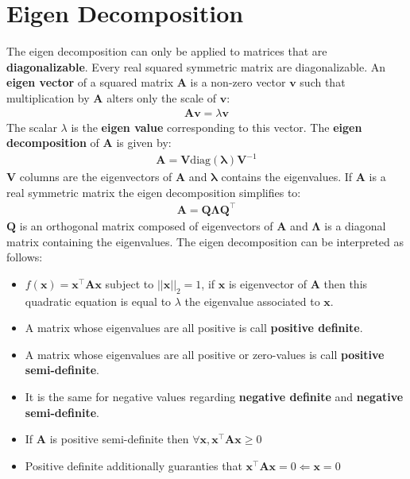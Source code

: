 \documentclass[12pt]{report}
\begin{document}
    \section{Eigen Decomposition}
        The eigen decomposition can only be applied to matrices that are \textbf{diagonalizable}. Every real squared symmetric matrix are diagonalizable.
        An \textbf{eigen vector} of a squared matrix $\boldsymbol{A}$ is a non-zero vector $\boldsymbol{v}$ such that multiplication by  $\boldsymbol{A}$ alters only the scale of $\boldsymbol{v}$:
        \begin{align}
            \boldsymbol{A}\boldsymbol{v} = \lambda \boldsymbol{v}
        \end{align}
        The scalar $\lambda$ is the \textbf{eigen value} corresponding to this    vector.
        The \textbf{eigen decomposition} of $\boldsymbol{A}$ is given by:
        \begin{align}
            \boldsymbol{A} =   \boldsymbol{V}\text{diag}(\boldsymbol{\lambda})\boldsymbol{V}^{-1}
        \end{align}
        $\boldsymbol{V}$ columns are the eigenvectors of $\boldsymbol{A}$ and $\boldsymbol{\lambda}$ contains the eigenvalues. If $\boldsymbol{A}$ is  a real symmetric matrix the eigen decomposition simplifies to:
        \begin{align}
            \boldsymbol{A} =   \boldsymbol{Q}\boldsymbol{\Lambda}\boldsymbol{Q}^{\top}
        \end{align}
        $\boldsymbol{Q}$ is an orthogonal matrix composed of eigenvectors of $\boldsymbol{A}$ and $\boldsymbol{\Lambda}$ is a diagonal matrix  containing the eigenvalues. The eigen decomposition can be interpreted as follows:
        \begin{itemize}
            \item $f(\boldsymbol{x}) = \boldsymbol{x}^\top \boldsymbol{A} \boldsymbol{x}$ subject to $||\boldsymbol{x}||_2 = 1$, if $\boldsymbol{x}$ is eigenvector of $\boldsymbol{A}$ then this quadratic equation is equal to $\lambda$ the eigenvalue associated to $\boldsymbol{x}$.
            \item A matrix whose eigenvalues are all positive is call \textbf{positive definite}.
            \item A matrix whose eigenvalues are all positive or zero-values is call \textbf{positive semi-definite}.
            \item It is the same for negative values regarding \textbf{negative definite} and \textbf{negative semi-definite}.
            \item If $\boldsymbol{A}$ is positive semi-definite then $\forall \boldsymbol{x},\boldsymbol{x}^\top  \boldsymbol{A} \boldsymbol{x} \geq 0$
            \item Positive definite additionally guaranties that $\boldsymbol{x}^\top  \boldsymbol{A} \boldsymbol{x} = 0 \Leftarrow \boldsymbol{x} = 0$
        \end{itemize}
        
\end{document}
